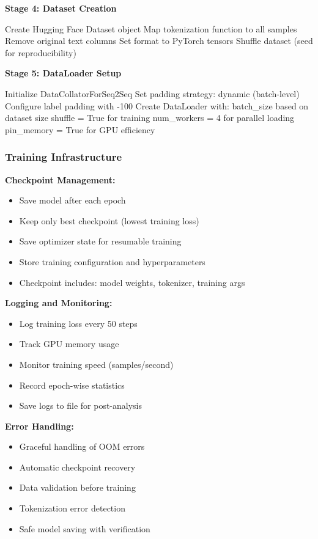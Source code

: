 \documentclass[12pt,a4paper]{article}
\begin{document}
\textbf{Stage 4: Dataset Creation}
\begin{algorithmic}[1]
\STATE Create Hugging Face Dataset object
\STATE Map tokenization function to all samples
\STATE Remove original text columns
\STATE Set format to PyTorch tensors
\STATE Shuffle dataset (seed for reproducibility)
\end{algorithmic}

\textbf{Stage 5: DataLoader Setup}
\begin{algorithmic}[1]
\STATE Initialize DataCollatorForSeq2Seq
\STATE Set padding strategy: dynamic (batch-level)
\STATE Configure label padding with -100
\STATE Create DataLoader with:
\STATE \quad batch\_size based on dataset size
\STATE \quad shuffle = True for training
\STATE \quad num\_workers = 4 for parallel loading
\STATE \quad pin\_memory = True for GPU efficiency
\end{algorithmic}

\subsubsection{Training Infrastructure}

\textbf{Checkpoint Management:}
\begin{itemize}
    \item Save model after each epoch
    \item Keep only best checkpoint (lowest training loss)
    \item Save optimizer state for resumable training
    \item Store training configuration and hyperparameters
    \item Checkpoint includes: model weights, tokenizer, training args
\end{itemize}

\textbf{Logging and Monitoring:}
\begin{itemize}
    \item Log training loss every 50 steps
    \item Track GPU memory usage
    \item Monitor training speed (samples/second)
    \item Record epoch-wise statistics
    \item Save logs to file for post-analysis
\end{itemize}

\textbf{Error Handling:}
\begin{itemize}
    \item Graceful handling of OOM errors
    \item Automatic checkpoint recovery
    \item Data validation before training
    \item Tokenization error detection
    \item Safe model saving with verification
\end{itemize}
\end{document}
